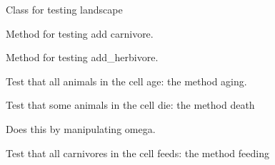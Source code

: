\documentclass[a4paper,10pt,english]{sphinxmanual}
\begin{document}
\begin{fulllineitems}
\label{\detokenize{tests:biosim.tests.test_landscape.TestLandscape}}
Class for testing landscape

\begin{fulllineitems}
\label{\detokenize{tests:biosim.tests.test_landscape.TestLandscape.test_add_carnivores}}
Method for testing add carnivore.

\end{fulllineitems}


\begin{fulllineitems}
\label{\detokenize{tests:biosim.tests.test_landscape.TestLandscape.test_add_herbivore}}
Method for testing add\_herbivore.

\end{fulllineitems}


\begin{fulllineitems}
\label{\detokenize{tests:biosim.tests.test_landscape.TestLandscape.test_aging}}
Test that all animals in the cell age: the method aging.

\end{fulllineitems}


\begin{fulllineitems}
\label{\detokenize{tests:biosim.tests.test_landscape.TestLandscape.test_death}}
Test that some animals in the cell die: the method death

Does this by manipulating omega.

\end{fulllineitems}


\begin{fulllineitems}
\label{\detokenize{tests:biosim.tests.test_landscape.TestLandscape.test_feeding_carnivores}}
Test that all carnivores in the cell feeds: the method feeding


\end{fulllineitems}
\end{fulllineitems}
\end{document}
